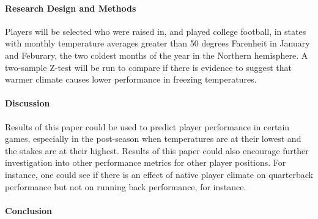 \documentclass[12pt]{article}
\begin{document}
\lipsum[3]

\paragraph{Research Design and Methods}
Players will be selected who were raised in, and played college football, in states with monthly 
temperature averages greater than 50 degrees Farenheit in January and Feburary, the two coldest 
months of the year in the Northern hemisphere. A two-sample Z-test will be run to compare if 
there is evidence to suggest that warmer climate causes lower performance in freezing temperatures. 

\lipsum[4]

\paragraph{Discussion}
Results of this paper could be used to predict player performance in certain games, especially 
in the post-season when temperatures are at their lowest and the stakes are at their highest. 
Results of this paper could also encourage further investigation into other performance metrics 
for other player positions. For instance, one could see if there is an effect of native player 
climate on quarterback performance but not on running back performance, for instance.

\lipsum[5] 

\paragraph{Conclusion}
\lipsum[1]




\end{document}
